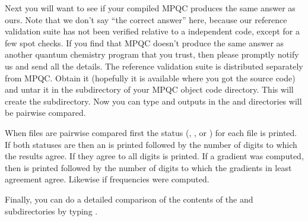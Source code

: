   Next you will want to see if your compiled MPQC produces the same answer
as ours.  Note that we don't say ``the correct answer'' here, because our
reference validation suite has not been verified relative to a independent
code, except for a few spot checks.  If you find that MPQC doesn't produce
the same answer as another quantum chemistry program that you trust, then
please promptly notify us and send all the details.  The reference
validation suite is distributed separately from MPQC.  Obtain it (hopefully
it is available where you got the source code) and untar it in the
 subdirectory of your MPQC object code
directory.  This will create the  subdirectory.  Now you can
type  and outputs in the  and 
directories will be pairwise compared.

  When files are pairwise compared first the status (,
, or ) for each file is printed.  If both
statuses are  then an  is printed followed by the number
of digits to which the results agree.  If they agree to all digits
 is printed.  If a gradient was computed, then  is
printed followed by the number of digits to which the gradients in least
agreement agree.  Likewise if frequencies were computed.

  Finally, you can do a detailed comparison of the contents of the
 and  subdirectories by typing .

